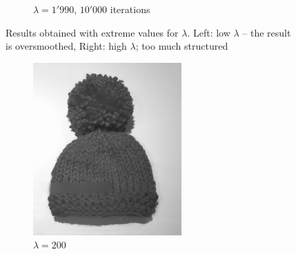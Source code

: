 \documentclass{paper}
\begin{document}
\begin{figure}[ht]
\begin{subfigure}[h]{0.45\textwidth}
    \caption*{$\lambda = 1'990$, $10'000$ iterations}
 \end{subfigure}
 \caption{Results obtained with extreme values for $\lambda$. Left: low $\lambda$ -- the result is oversmoothed, Right: high $\lambda$; too much structured}
 \label{fig:extreme-lambda-values}
\end{figure}
\begin{figure}[ht]
 \centering
 \begin{subfigure}[h]{0.3\textwidth}
    \centering
    \includegraphics[width=\textwidth]{hat-iter10000-lambda200-alpha0_001}
    \caption*{$\lambda = 200$}
 \end{subfigure}
~
 \begin{subfigure}[h]{0.3\textwidth}
    \centering

\end{subfigure}
\end{figure}
\end{document}
